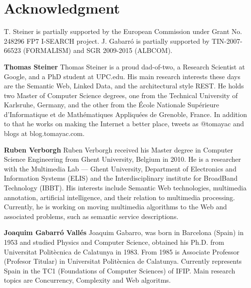 \documentclass[twocolumn]{article}
\begin{document}
\section*{Acknowledgment}

T. Steiner is partially supported by the European Commission under Grant No. 248296 FP7 I-SEARCH project. J. Gabarr\'o is partially supported by TIN-2007-66523 (FORMALISM) and SGR 2009-2015 (ALBCOM). 




\vspace{5mm}

 \vspace{5mm}

\textbf{Thomas Steiner}
Thomas Steiner is a proud dad-of-two, a Research Scientist at Google, and a PhD student at UPC.edu. His main research interests these days are the Semantic Web, Linked Data, and the architectural style REST. He holds two Master of Computer Science degrees, one from the Technical University of Karlsruhe, Germany, and the other from the École Nationale Supérieure d'Informatique et de Mathématiques Appliquées de Grenoble, France. In addition to that he works on making the Internet a better place, tweets as @tomayac and blogs at blog.tomayac.com.

\vspace{4mm}

\textbf{Ruben Verborgh}
Ruben Verborgh received his Master degree in Computer Science Engineering from Ghent University, Belgium in 2010. He is a researcher with the Multimedia Lab — Ghent University, Department of Electronics and Information Systems (ELIS) and the Interdisciplinary institute for BroadBand Technology (IBBT). His interests include Semantic Web technologies, multimedia annotation, artificial intelligence, and their relation to multimedia processing. Currently, he is working on moving multimedia algorithms to the Web and associated problems, such as semantic service descriptions.

\vspace{4mm}

\textbf{Joaquim Gabarró Vallés}
Joaquim Gabarro, was born in Barcelona (Spain) in 1953 and studied Physics and Computer Science, obtained his Ph.D.
from Universitat Politècnica de Calatunya in 1983. From 1985 is Associate Professor (Profesor Titular) in Universitat Politècnica de Calatunya. Currently represents
Spain in the TC1 (Foundations of Computer Sciences) of IFIP. Main research topics
are Concurrency, Complexity and
Web algoritms.
\end{document}
